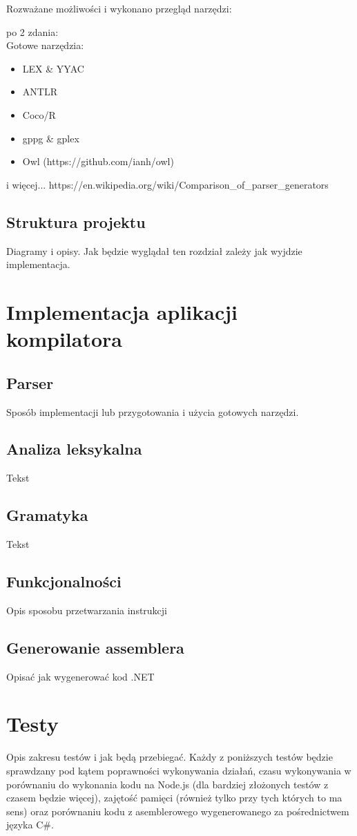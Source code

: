 \documentclass[a4paper]{article}
\begin{document}
Rozważane możliwości i wykonano przegląd narzędzi:

po 2 zdania: \\
Gotowe narzędzia:
\begin{itemize}
  \item LEX \& YYAC
  \item ANTLR
  \item Coco/R
  \item gppg \& gplex
  \item Owl (https://github.com/ianh/owl)
\end{itemize}
i więcej... https://en.wikipedia.org/wiki/Comparison\_of\_parser\_generators


\subsection{Struktura projektu}
Diagramy i opisy.
Jak będzie wyglądał ten rozdział zależy jak wyjdzie implementacja.

\section{Implementacja aplikacji kompilatora}
\subsection{Parser}
Sposób implementacji lub przygotowania i użycia gotowych narzędzi.

\subsection{Analiza leksykalna}
Tekst
\subsection{Gramatyka}
Tekst
\subsection{Funkcjonalności}
Opis sposobu przetwarzania instrukcji
\subsection{Generowanie assemblera}
Opisać jak wygenerować kod .NET

\section{Testy}
Opis zakresu testów i jak będą przebiegać.
Każdy z poniższych testów będzie sprawdzany pod kątem poprawności wykonywania działań, czasu wykonywania w porównaniu do wykonania kodu na Node.js (dla bardziej złożonych testów z czasem będzie więcej), zajętość pamięci (również tylko przy tych których to ma sens) oraz porównaniu kodu z asemblerowego wygenerowanego za pośrednictwem języka C\#.
\end{document}
